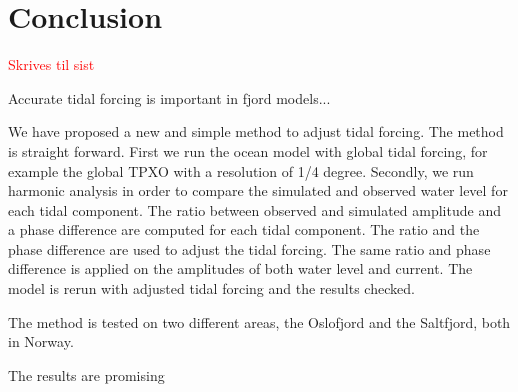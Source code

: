 \section{Conclusion}

\textcolor{Red}{Skrives til sist}

Accurate tidal forcing is important in fjord models...

We have proposed a new and simple method to adjust tidal forcing. The method is straight forward. First we run the ocean model with global tidal forcing, for example the global TPXO with a resolution of 1/4 degree. Secondly, we run harmonic analysis in order to compare the simulated and observed water level for each tidal component. The ratio between observed and simulated amplitude and a phase difference are computed for each tidal component. The ratio and the phase difference are used to adjust the tidal forcing. The same ratio and phase difference is applied on the amplitudes of both water level and current. The model is rerun with adjusted tidal forcing and the results checked.

The method is tested on two different areas, the Oslofjord and the Saltfjord, both in Norway.
 
The results are promising 
